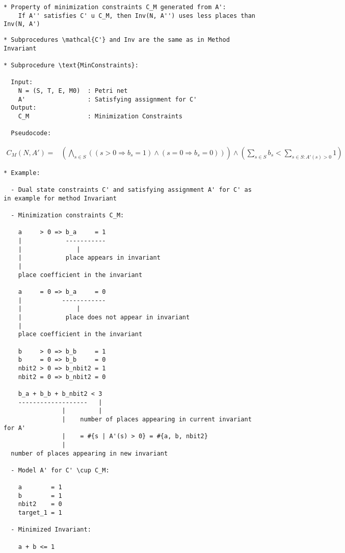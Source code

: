 \documentclass{llncs}
\begin{document}
\begin{verbatim}
* Property of minimization constraints C_M generated from A': 
    If A'' satisfies C' u C_M, then Inv(N, A'') uses less places than Inv(N, A')
\end{verbatim}

\newpage

\begin{verbatim}
* Subprocedures \mathcal{C'} and Inv are the same as in Method Invariant

* Subprocedure \text{MinConstraints}:

  Input:
    N = (S, T, E, M0)  : Petri net
    A'                 : Satisfying assignment for C'
  Output:
    C_M                : Minimization Constraints

  Pseudocode:

\end{verbatim}

\begin{align*}
  C_M(N, A') =& \left( \bigwedge_{s \in S} \left(
      (s > 0 \Rightarrow b_s = 1) \land (s = 0 \Rightarrow b_s = 0)
    \right) \right) \land
    \left( \sum_{s \in S} b_s < \sum_{s \in S : A'(s) > 0} 1 \right)
\end{align*}

\newpage

\begin{verbatim}
* Example:

  - Dual state constraints C' and satisfying assignment A' for C' as in example for method Invariant

  - Minimization constraints C_M:

    a     > 0 => b_a     = 1
    |            -----------
    |               |
    |            place appears in invariant
    |
    place coefficient in the invariant

    a     = 0 => b_a     = 0
    |           ------------
    |               |
    |            place does not appear in invariant
    |
    place coefficient in the invariant

    b     > 0 => b_b     = 1
    b     = 0 => b_b     = 0
    nbit2 > 0 => b_nbit2 = 1
    nbit2 = 0 => b_nbit2 = 0

    b_a + b_b + b_nbit2 < 3
    -------------------   |
                |         |
                |    number of places appearing in current invariant for A'
                |    = #{s | A'(s) > 0} = #{a, b, nbit2}
                |
  number of places appearing in new invariant
  
  - Model A' for C' \cup C_M:

    a        = 1
    b        = 1
    nbit2    = 0
    target_1 = 1
    
  - Minimized Invariant:

    a + b <= 1
\end{verbatim}
    
\end{document}

